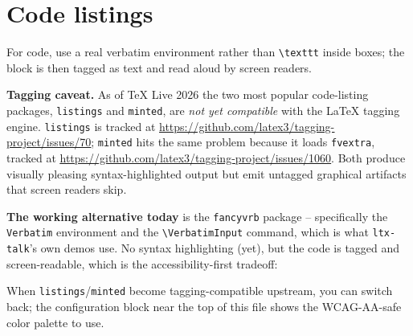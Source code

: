 \documentclass{article}
\newcommand{\urlu}[1]{\uline{\url{#1}}}        %
\begin{document}
\section{Code listings}

For code, use a real verbatim environment rather than \texttt{\textbackslash texttt} inside boxes; the block is then tagged as text and read aloud by screen readers.

\textbf{Tagging caveat.} As of TeX Live 2026 the two most popular code-listing packages, \texttt{listings} and \texttt{minted}, are \emph{not yet compatible} with the LaTeX tagging engine. \texttt{listings} is tracked at \urlu{https://github.com/latex3/tagging-project/issues/70}; \texttt{minted} hits the same problem because it loads \texttt{fvextra}, tracked at \urlu{https://github.com/latex3/tagging-project/issues/1060}. Both produce visually pleasing syntax-highlighted output but emit untagged graphical artifacts that screen readers skip.

\textbf{The working alternative today} is the \texttt{fancyvrb} package -- specifically the \texttt{Verbatim} environment and the \texttt{\textbackslash VerbatimInput} command, which is what \texttt{ltx-talk}'s own demos use. No syntax highlighting (yet), but the code is tagged and screen-readable, which is the accessibility-first tradeoff:


\noindent When \texttt{listings}/\texttt{minted} become tagging-compatible upstream, you can switch back; the configuration block near the top of this file shows the WCAG-AA-safe color palette to use.
\end{document}
